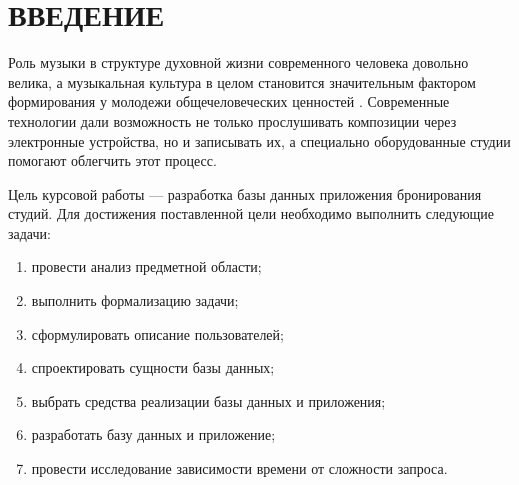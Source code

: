 \chapter*{ВВЕДЕНИЕ}
Роль музыки в структуре духовной жизни современного человека довольно велика, а музыкальная культура в целом становится значительным фактором формирования у молодежи общечеловеческих ценностей \cite{music_for_youth}.
Современные технологии дали возможность не только прослушивать композиции через электронные устройства, но и записывать их, а специально оборудованные студии помогают облегчить этот процесс.

Цель курсовой работы --- разработка базы данных приложения бронирования студий.
Для достижения поставленной цели необходимо выполнить следующие задачи:

\begin{enumerate}
	\item провести анализ предметной области;
	\item выполнить формализацию задачи;
	\item сформулировать описание пользователей;
	\item спроектировать сущности базы данных;
	\item выбрать средства реализации базы данных и приложения;
	\item разработать базу данных и приложение;
	\item провести исследование зависимости времени от сложности запроса.
\end{enumerate}